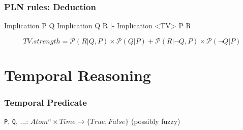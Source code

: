 \documentclass[aspectratio=169]{beamer}
\begin{document}
\begin{frame}[fragile]

  \frametitle{PLN rules: Deduction}
\begin{semiverbatim}
Implication
  P
  Q
Implication
  Q
  R
|-
Implication <TV>
  P
  R
\end{semiverbatim}
$$TV.strength = \mathcal{P}(R|Q,P)\times\mathcal{P}(Q|P) + \mathcal{P}(R|¬Q,P)\times\mathcal{P}(¬Q|P)$$
\end{frame}

\section {Temporal Reasoning}

\begin{frame}
  \frametitle{Temporal Predicate}
\texttt{P}, \texttt{Q}, $\hdots$: $Atom^n \times Time \rightarrow \{True, False\}$
{\tiny \alert{(possibly fuzzy)}}

\end{frame}
\end{document}
